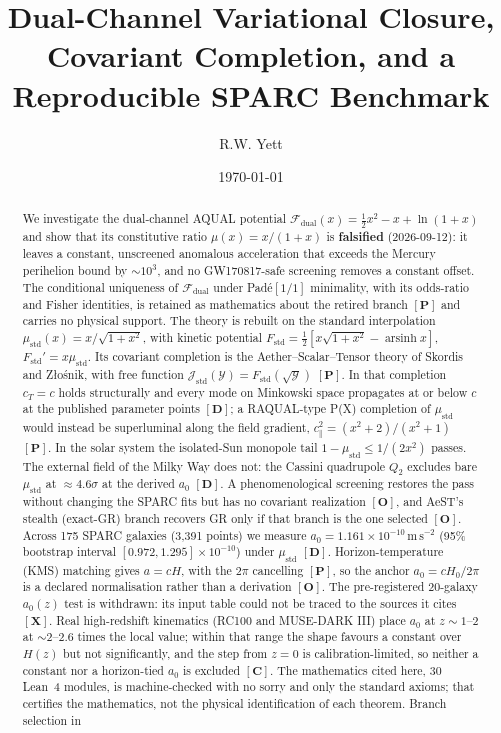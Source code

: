 \documentclass[aps,prd,preprint,superscriptaddress,nofootinbib,amsmath,amssymb,floatfix]{revtex4-2}
\makeatletter
\DeclareRobustCommand{\rntexttt}[1]{%
  \ifmmode
    \nfss@text{\ttfamily\hyphenchar\font=-1 #1}%
  \else
    \hmode@bgroup\ttfamily\hyphenchar\font=-1 #1\egroup
  \fi}
\DeclareRobustCommand{\_}{%
    \ifmmode\nfss@text{\textunderscore}\else\textunderscore\penalty\z@\fi}%
\let\texttt\rntexttt
\makeatother
\begin{document}


\title{Dual-Channel Variational Closure, Covariant Completion, and a Reproducible SPARC Benchmark}

\author{R.W. Yett}

\date{\today}

\begin{abstract}
We investigate the dual-channel AQUAL potential $\mathcal{F}_{\text{dual}}(x) = \tfrac{1}{2}x^2 - x + \ln(1+x)$ and show that its constitutive ratio $\mu(x) = x/(1+x)$ is \textbf{falsified} (2026-09-12): it leaves a constant, unscreened anomalous acceleration that exceeds the Mercury perihelion bound by $\sim10^3$, and no GW170817-safe screening removes a constant offset. The conditional uniqueness of $\mathcal{F}_{\text{dual}}$ under Pad\'e$[1/1]$ minimality, with its odds-ratio and Fisher identities, is retained as mathematics about the retired branch $\mathbf{[P]}$ and carries no physical support. The theory is rebuilt on the standard interpolation $\mu_{\text{std}}(x) = x/\sqrt{1+x^2}$, with kinetic potential $F_{\text{std}} = \tfrac12[x\sqrt{1+x^2} - \operatorname{arsinh} x]$, $F_{\text{std}}' = x\mu_{\text{std}}$. Its covariant completion is the Aether--Scalar--Tensor theory of Skordis and Z\l{}o\'snik, with free function $\mathcal{J}_{\text{std}}(\mathcal{Y}) = F_{\text{std}}(\sqrt{\mathcal{Y}})$ $\mathbf{[P]}$. In that completion $c_T = c$ holds structurally and every mode on Minkowski space propagates at or below $c$ at the published parameter points $\mathbf{[D]}$; a RAQUAL-type P(X) completion of $\mu_{\text{std}}$ would instead be superluminal along the field gradient, $c_\parallel^2 = (x^2+2)/(x^2+1)$ $\mathbf{[P]}$. In the solar system the isolated-Sun monopole tail $1-\mu_{\text{std}} \le 1/(2x^2)$ passes. The external field of the Milky Way does not: the Cassini quadrupole $Q_2$ excludes bare $\mu_{\text{std}}$ at $\approx 4.6\sigma$ at the derived $a_0$ $\mathbf{[D]}$. A phenomenological screening restores the pass without changing the SPARC fits but has no covariant realization $\mathbf{[O]}$, and AeST's stealth (exact-GR) branch recovers GR only if that branch is the one selected $\mathbf{[O]}$. Across 175 SPARC galaxies (3,391 points) we measure $a_0 = 1.161\times10^{-10}\,\mathrm{m\,s^{-2}}$ (95\% bootstrap interval $[0.972, 1.295]\times10^{-10}$) under $\mu_{\text{std}}$ $\mathbf{[D]}$. Horizon-temperature (KMS) matching gives $a = cH$, with the $2\pi$ cancelling $\mathbf{[P]}$, so the anchor $a_0 = cH_0/2\pi$ is a declared normalisation rather than a derivation $\mathbf{[O]}$. The pre-registered 20-galaxy $a_0(z)$ test is withdrawn: its input table could not be traced to the sources it cites $\mathbf{[X]}$. Real high-redshift kinematics (RC100 and MUSE-DARK III) place $a_0$ at $z\sim1$--$2$ at $\sim2$--$2.6$ times the local value; within that range the shape favours a constant over $H(z)$ but not significantly, and the step from $z=0$ is calibration-limited, so neither a constant nor a horizon-tied $a_0$ is excluded $\mathbf{[C]}$. The mathematics cited here, 30 Lean~4 modules, is machine-checked with no \texttt{sorry} and only the standard axioms; that certifies the mathematics, not the physical identification of each theorem. Branch selection in 
\end{abstract}
\end{document}
